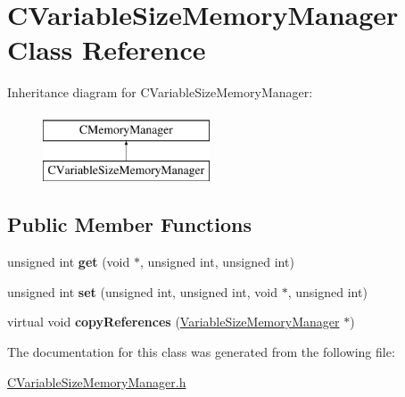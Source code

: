 \hypertarget{classCVariableSizeMemoryManager}{\section{\-C\-Variable\-Size\-Memory\-Manager \-Class \-Reference}
\label{classCVariableSizeMemoryManager}
}
\-Inheritance diagram for \-C\-Variable\-Size\-Memory\-Manager\-:\begin{figure}[H]
\begin{center}
\leavevmode
\includegraphics[height=2.000000cm]{classCVariableSizeMemoryManager}
\end{center}
\end{figure}
\subsection*{\-Public \-Member \-Functions}
\begin{DoxyCompactItemize}
\item 
\hypertarget{classCVariableSizeMemoryManager_ab6d2de02a6f71ff09be4c2263da62dfe}{unsigned int {\bfseries get} (void $\ast$, unsigned int, unsigned int)}\label{classCVariableSizeMemoryManager_ab6d2de02a6f71ff09be4c2263da62dfe}

\item 
\hypertarget{classCVariableSizeMemoryManager_ac15bdc14b441809462d2c123a3eb7441}{unsigned int {\bfseries set} (unsigned int, unsigned int, void $\ast$, unsigned int)}\label{classCVariableSizeMemoryManager_ac15bdc14b441809462d2c123a3eb7441}

\item 
\hypertarget{classCVariableSizeMemoryManager_a07e410492f57ee182918f078bb3555a0}{virtual void {\bfseries copy\-References} (\hyperlink{classVariableSizeMemoryManager}{\-Variable\-Size\-Memory\-Manager} $\ast$)}\label{classCVariableSizeMemoryManager_a07e410492f57ee182918f078bb3555a0}

\end{DoxyCompactItemize}


\-The documentation for this class was generated from the following file\-:\begin{DoxyCompactItemize}
\item 
\hyperlink{CVariableSizeMemoryManager_8h}{\-C\-Variable\-Size\-Memory\-Manager.\-h}\end{DoxyCompactItemize}
